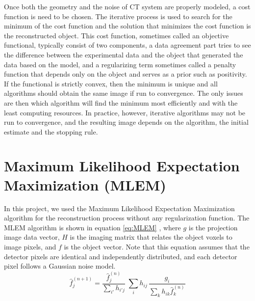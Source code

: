 Once both the geometry and the noise of CT system are properly modeled, a cost function is need to be chosen.  The iterative process is used to search for the minimum of the cost function and the solution that minimizes the cost function is the reconstructed object.  This cost function, sometimes called an objective functional, typically consist of two components, a data agreement part tries to see the difference between the experimental data and the object that generated the data based on the model, and a regularizing term sometimes called a penalty function that depends only on the object and serves as a prior such as positivity.  If the functional is strictly convex, then the minimum is unique and all algorithms should obtain the same image if run to convergence.  The only issues are then which algorithm will find the minimum most efficiently and with the least computing resources.  In practice, however, iterative algorithms may not be run to convergence, and the resulting image depends on the algorithm, the initial estimate and the stopping rule.

\section{Maximum Likelihood Expectation Maximization (MLEM) }
In this project, we used the Maximum Likelihood Expectation Maximization algorithm for the reconstruction process without any regularization function.  The MLEM algorithm is shown in equation \ref{eq:MLEM} \citep{EmissionTom2004}, where $g$ is the projection image data vector, $H$ is the imaging matrix that relates the object voxels to image pixels, and $f$ is the object vector.  Note that this equation assumes that the detector pixels are identical and independently distributed, and each detector pixel follows a Gaussian noise model. 
\begin{equation}
\hat{f}^{(n+1)}_{j} = \frac{\hat{f}^{(n)}_j}{{\sum\limits_{i'}} h_{i'j}} \; 
						\sum\limits_{i} h_{ij} \, \frac{g_{i}}{\sum\limits_{k} h_{ik} \hat{f}_{k}^{(n)}}
\label{eq:MLEM}
\end{equation}

